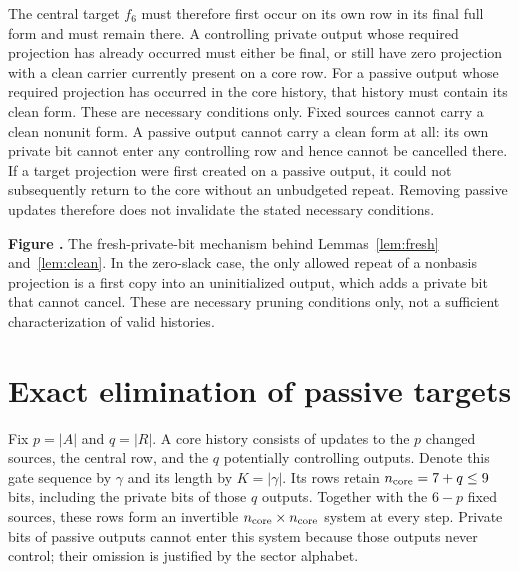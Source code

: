 \documentclass[11pt]{article}
\newcommand{\prooffigure}[3]{%
  \begin{center}
  \begin{minipage}{.98\linewidth}
  \centering
  \resizebox{\linewidth}{!}{}\par
  \refstepcounter{figure}\label{#2}%
  \small\textbf{Figure \thefigure.} #3
  \end{minipage}
  \end{center}}
\begin{document}
The central target $f_6$ must therefore first occur on its own row in
its final full form and must remain there. A controlling private output
whose required projection has already occurred must either be final,
or still have zero projection with a clean carrier currently present
on a core row. For a passive output whose required projection has
occurred in the core history, that history must contain its clean form.
These are necessary conditions only.
Fixed sources cannot carry a clean nonunit form. A passive output cannot
carry a clean form at all: its own private bit cannot enter any controlling
row and hence cannot be cancelled there. If a target projection were
first created on a passive output, it could not subsequently return to
the core without an unbudgeted repeat. Removing passive updates therefore
does not invalidate the stated necessary conditions.
\prooffigure{clean_carrier}{fig:clean}{The fresh-private-bit mechanism
behind Lemmas~\ref{lem:fresh} and~\ref{lem:clean}. In the zero-slack case,
the only allowed repeat of a nonbasis projection is a first copy into an
uninitialized output, which adds a private bit that cannot cancel. These are
necessary pruning conditions only, not a sufficient characterization of
valid histories.}

\section{Exact elimination of passive targets}
Fix $p=|A|$ and $q=|R|$. A core history consists of updates to the $p$
changed sources, the central row, and the $q$ potentially controlling
outputs. Denote this gate sequence by $\gamma$ and its length by
$K=|\gamma|$. Its rows retain
$n_{\rm core}=7+q\le9$ bits, including the private bits
of those $q$ outputs. Together with the $6-p$ fixed sources, these rows
form an invertible $n_{\rm core}\times n_{\rm core}$ system at every step.
Private bits of
passive outputs cannot enter this system because those outputs never
control; their omission is justified by the sector alphabet.
\end{document}
